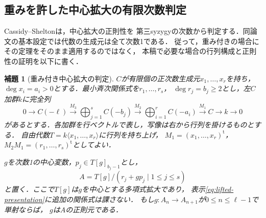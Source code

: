 \documentclass[11pt,a4paper]{ltjsarticle}
\newtheorem{lemma}[theorem]{補題}
\theoremstyle{definition}
\begin{document}
\subsection{重みを許した中心拡大の有限次数判定}

Cassidy--Shelton\cite[Theorems~3.6--3.7]{CS}は，中心拡大の正則性を
第三syzygyの次数から判定する．同論文の基本設定では代数の生成元は全て次数1である．
従って，重み付きの場合にその定理をそのまま適用するのではなく，
本稿で必要な場合の行列構成と正則性の証明を以下に書く．

\begin{lemma}[重み付き中心拡大の判定]\label{lem:weighted-central-extension}
$C$が有限個の正次数生成元$x_1,\ldots,x_r$を持ち，
$\deg x_i=a_i>0$とする．最小斉次関係式を$r_1,\ldots,r_s$，
$\deg r_j=b_j\geq2$とし，左$C$加群$k$に完全列
\begin{equation}\label{eq:weighted-base-resolution}
0\longrightarrow C(-\ell)
 \xrightarrow{M_3}\bigoplus_{j=1}^{s}C(-b_j)
 \xrightarrow{M_2}\bigoplus_{i=1}^{r}C(-a_i)
 \xrightarrow{M_1}C\longrightarrow k\longrightarrow0
\end{equation}
があるとする．各加群を行ベクトルで表し，写像は右から行列を掛けるものとする．
自由代数$T=k\langle x_1,\ldots,x_r\rangle$に行列を持ち上げ，
$M_1=(x_1,\ldots,x_r)^{\mathrm t}$，
$M_2M_1=(r_1,\ldots,r_s)^{\mathrm t}$としてよい．

$g$を次数1の中心変数，$p_j\in T[g]_{b_j-1}$とし，
\begin{equation}\label{eq:lifted-presentation}
 A=T[g]/(r_j+gp_j\mid1\leq j\leq s)
\end{equation}
と置く．ここで$T[g]$は$g$を中心とする多項式拡大であり，
表示\eqref{eq:lifted-presentation}に追加の関係式は課さない．
もし$g:A_n\to A_{n+1}$が$0\leq n\leq\ell-1$で単射ならば，
$g$は$A$の正則元である．
\end{lemma}
\end{document}
